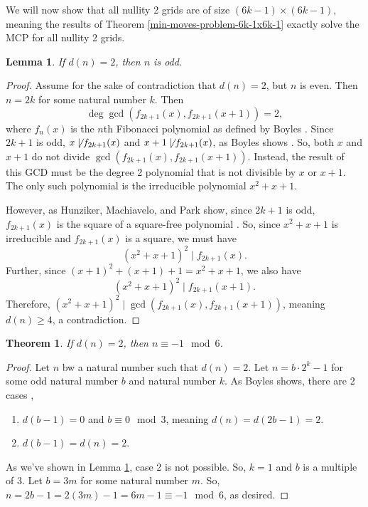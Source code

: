 \documentclass[a4paper]{article}
\newtheorem{lemma}{Lemma}[section]
\newtheorem{theorem}{Theorem}[section]
\begin{document}
	We will now show that all nullity 2 grids are of size $(6k-1) \times (6k-1)$, meaning the results of Theorem \ref{min-moves-problem-6k-1x6k-1} exactly solve the MCP for all nullity 2 grids.
	
	\begin{lemma}\label{all_nullity2_even}
		If $d(n) = 2$, then $n$ is odd.
	\end{lemma}
	\begin{proof}
		Assume for the sake of contradiction that $d(n) = 2$, but $n$ is even.
		Then $n = 2k$ for some natural number $k$.
		Then
		\begin{equation*}
			\deg{\gcd{\left(f_{2k+1}(x), f_{2k+1}(x+1)\right)}} = 2,
		\end{equation*}
		where $f_n(x)$ is the $n$th Fibonacci polynomial as defined by Boyles \cite{Boyles2022}.
		Since $2k+1$ is odd, $x \not\mid f_{2k+1}(x)$ and $x+1 \not\mid f_{2k+1}(x)$, as Boyles shows \cite{Boyles2022}.
		So, both $x$ and $x+1$ do not divide $\gcd{\left(f_{2k+1}(x), f_{2k+1}(x+1)\right)}$.
		Instead, the result of this GCD must be the degree 2 polynomial that is not divisible by $x$ or $x+1$.
		The only such polynomial is the irreducible polynomial $x^2 + x + 1$.
		
		However, as Hunziker, Machiavelo, and Park show, since $2k+1$ is odd, $f_{2k+1}(x)$ is the square of a square-free polynomial \cite{HUNZIKER2004465}.
		So, since $x^2 + x + 1$ is irreducible and $f_{2k+1}(x)$ is a square, we must have
		\begin{equation*}
			(x^2+x+1)^2 \mid f_{2k+1}(x).
		\end{equation*}
		Further, since $(x+1)^2 + (x+1) + 1 = x^2 + x + 1$, we also have 
		\begin{equation*}
			(x^2+x+1)^2 \mid f_{2k+1}(x+1).
		\end{equation*}
		Therefore, $(x^2+x+1)^2 \mid \gcd{\left(f_{2k+1}(x), f_{2k+1}(x+1)\right)}$, meaning $d(n) \geq 4$, a contradiction.
	\end{proof}

	\begin{theorem}\label{nullity2-5mod6}
		If $d(n) = 2$, then $n \equiv -1 \mod 6$.
	\end{theorem}
	\begin{proof}
		Let $n$ bw a natural number such that $d(n) = 2$.
		Let $n = b\cdot2^k - 1$ for some odd natural number $b$ and natural number $k$.
		As Boyles shows, there are 2 cases \cite{Boyles2022},
		\begin{enumerate}
			\item
				$d(b-1) = 0$ and $b \equiv 0 \mod 3$, meaning $d(n) = d(2b-1) = 2$.
			\item
				$d(b-1) = d(n) = 2$.
		\end{enumerate}
		As we've shown in Lemma \ref{all_nullity2_even}, case 2 is not possible.
		So, $k = 1$ and $b$ is a multiple of 3.
		Let $b = 3m$ for some natural number $m$.
		So, $n = 2b - 1 = 2(3m) - 1 = 6m - 1 \equiv -1 \mod 6$, as desired. 
	\end{proof}
\end{document}
